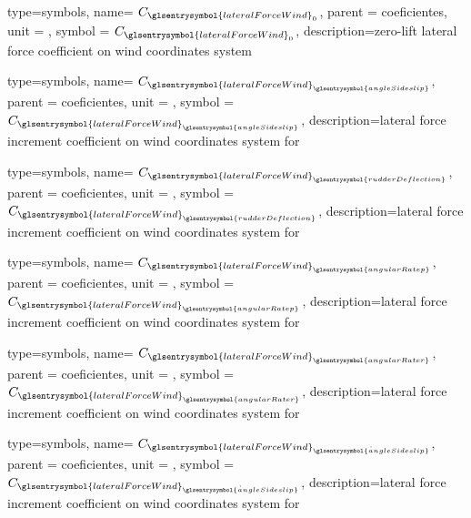 {type=symbols,
    name= \ensuremath{C_{\glsentrysymbol{lateralForceWind}_{0}}},
    parent = {coeficientes},
    unit = \unexpanded{},
    symbol = \ensuremath{C_{\glsentrysymbol{lateralForceWind}_{0}}},
    description={zero-lift lateral force coefficient on wind coordinates system }
}

{type=symbols,
    name= \ensuremath{C_{{\glsentrysymbol{lateralForceWind}}_{\glsentrysymbol{angleSideslip}}}},
    parent = {coeficientes},
    unit = \unexpanded{},
    symbol = \ensuremath{C_{{\glsentrysymbol{lateralForceWind}}_{\glsentrysymbol{angleSideslip}}}},
    description={lateral force increment coefficient on wind coordinates system  for }
}

{type=symbols,
    name= \ensuremath{C_{{\glsentrysymbol{lateralForceWind}}_{\glsentrysymbol{rudderDeflection}}}}, 
    parent = {coeficientes},
    unit = \unexpanded{},
    symbol = \ensuremath{C_{{\glsentrysymbol{lateralForceWind}}_{\glsentrysymbol{rudderDeflection}}}},
    description={lateral force increment coefficient on wind coordinates system  for }
}


{type=symbols,
    name= \ensuremath{C_{{\glsentrysymbol{lateralForceWind}}_{\glsentrysymbol{angularRatep}}}},
    parent = {coeficientes},
    unit = \unexpanded{},
    symbol = \ensuremath{C_{{\glsentrysymbol{lateralForceWind}}_{\glsentrysymbol{angularRatep}}}},
    description={lateral force increment coefficient on wind coordinates system  for }
}

{type=symbols,
    name= \ensuremath{C_{{\glsentrysymbol{lateralForceWind}}_{\glsentrysymbol{angularRater}}}},
    parent = {coeficientes},
    unit = \unexpanded{},
    symbol = \ensuremath{C_{{\glsentrysymbol{lateralForceWind}}_{\glsentrysymbol{angularRater}}}},
    description={lateral force increment coefficient on wind coordinates system  for }
}


{type=symbols,
    name= \ensuremath{C_{{\glsentrysymbol{lateralForceWind}}_{\dot{\glsentrysymbol{angleSideslip}}}}},
    parent = {coeficientes},
    unit = \unexpanded{},
    symbol = \ensuremath{C_{{\glsentrysymbol{lateralForceWind}}_{\dot{\glsentrysymbol{angleSideslip}}}}},
    description={lateral force increment coefficient on wind coordinates system  for }
}
